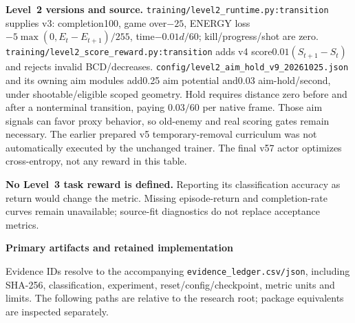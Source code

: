 \documentclass[11pt,a4paper]{article}
\newcommand{\topic}[2]{\vspace*{-4mm}{\small\color{teal}\textbf{#1}}\par{\LARGE\bfseries #2}\par\vspace{3mm}}
\newcommand{\pathref}[1]{\nolinkurl{#1}}
\begin{document}
\textbf{Level~2 versions and source.} \pathref{training/level2_runtime.py:transition} supplies v3: completion100, game over$-25$, ENERGY loss$-5\max(0,E_t-E_{t+1})/255$, time$-0.01d/60$; kill/progress/shot are zero. \pathref{training/level2_score_reward.py:transition} adds v4 score$0.01(S_{t+1}-S_t)$ and rejects invalid BCD/decreases. \pathref{config/level2_aim_hold_v9_20261025.json} and its owning aim modules add0.25 aim potential and0.03 aim-hold/second, under shootable/eligible scoped geometry. Hold requires distance zero before and after a nonterminal transition, paying $0.03/60$ per native frame. Those aim signals can favor proxy behavior, so old-enemy and real scoring gates remain necessary. The earlier prepared v5 temporary-removal curriculum was not automatically executed by the unchanged trainer. The final v57 actor optimizes cross-entropy, not any reward in this table.

\textbf{No Level~3 task reward is defined.} Reporting its classification accuracy as return would change the metric. Missing episode-return and completion-rate curves remain unavailable; source-fit diagnostics do not replace acceptance metrics.

\endgroup
\newpage
\topic{APPENDIX B / TRACEABILITY}{Primary artifacts and retained implementation}
\small
Evidence IDs resolve to the accompanying \pathref{evidence_ledger.csv/json}, including SHA-256, classification, experiment, reset/config/checkpoint, metric units and limits. The following paths are relative to the research root; package equivalents are inspected separately.
\end{document}
